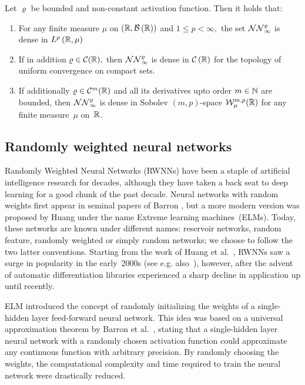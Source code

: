 \begin{theorem}\label{thm:UAT}
Let $\varrho$ be bounded and
non-constant activation function. Then it holds that:
\begin{enumerate}
\item For any finite measure $\mu$ on $\left(\mathbb{R}, \mathcal{B}\left(\mathbb{R}\right)\right)$ and $1 \leq p<\infty,$ the set
$\mathcal{NN}_{\infty}^{\varrho}$ is dense in $L^{p}\left(\mathbb{R}, \mu\right)$
\item If in addition $\varrho \in \mathcal{C}(\mathbb{R}),$ then $\mathcal{NN}_{\infty}^{\varrho}$ is dense in $\mathcal{C}\left(\mathbb{R}\right)$ for the
topology of uniform convergence on compact sets.
\item If additionally $\varrho\in \mathcal{C}^m(\mathbb{R})$ and all its derivatives upto order $m\in\mathbb{N}$ are bounded, then $\mathcal{NN}_{\infty}^{\varrho}$ is dense in Sobolev $(m,p)$-space $\mathcal{W}^{m,p}_{\mu}(\mathbb{R})$ for any finite measure~$\mu$ on~$\mathbb{R}$.
\end{enumerate}
\end{theorem}

\subsection{Randomly weighted neural networks}\label{sec:RWNN}
Randomly Weighted Neural Networks (RWNNs) have been a staple of artificial intelligence research for decades, although they have taken a back seat to deep learning for a good chunk of the past decade. Neural networks with random weights first appear in seminal papers of Barron \cite{Barron1992NeuralSystems, Barron1993UniversalFunction}, but a more modern version was proposed by Huang \cite{Huang2006UniversalNodes} under the name Extreme learning machines~(ELMs). Today, these networks are known under different names: reservoir networks, random feature, randomly weighted or simply random networks; we choose to follow the two latter conventions. Starting from the work of Huang et al.~\cite{Huang2006UniversalNodes}, RWNNs saw a surge in popularity in the early~2000s (see e.g. also~\cite{Rahimi2007RandomMachines, Rahimi2008WeightedLearning}), however, after the advent of automatic differentiation libraries experienced a sharp decline in application up until recently.

ELM introduced the concept of randomly initializing the weights of a single-hidden layer feed-forward neural network. This idea was based on a universal approximation theorem by Barron et al.~\cite{Barron1993UniversalFunction}, stating that a single-hidden layer neural network with a randomly chosen activation function could approximate any continuous function with arbitrary precision. By randomly choosing the weights, the computational complexity and time required to train the neural network were drastically reduced.


